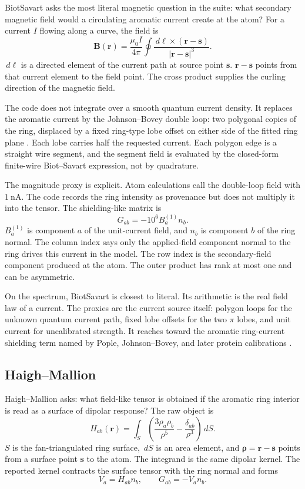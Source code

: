 \documentclass[11pt]{article}
\newcommand{\dd}{\,d}
\begin{document}
BiotSavart asks the most literal magnetic question in the suite: what secondary
magnetic field would a circulating aromatic current create at the atom? For a
current \(I\) flowing along a curve, the field is
\[
  \bm B(\bm r)
  =
  \frac{\mu_0 I}{4\pi}
  \oint
  \frac{\dd\bm\ell\times(\bm r-\bm s)}
       {|\bm r-\bm s|^3}.
\]
\(\dd\bm\ell\) is a directed element of the current path at source point
\(\bm s\). \(\bm r-\bm s\) points from that current element to the field point.
The cross product supplies the curling direction of the magnetic field.

The code does not integrate over a smooth quantum current density. It replaces
the aromatic current by the Johnson--Bovey double loop: two polygonal copies of
the ring, displaced by a fixed ring-type lobe offset on either side of the
fitted ring plane \cite{johnson1958}. Each lobe carries half the requested
current. Each polygon edge is a straight wire segment, and the segment field is
evaluated by the closed-form finite-wire Biot--Savart expression, not by
quadrature.

The magnitude proxy is explicit. Atom calculations call the double-loop field
with \(\SI{1}{\nano\ampere}\). The code records the ring intensity as
provenance but does not multiply it into the tensor. The shielding-like matrix
is
\[
  G_{ab}=-10^6 B_a^{(1)} n_b .
\]
\(B_a^{(1)}\) is component \(a\) of the unit-current field, and \(n_b\) is
component \(b\) of the ring normal. The column index says only the applied-field
component normal to the ring drives this current in the model. The row index is
the secondary-field component produced at the atom. The outer product has rank
at most one and can be asymmetric.

On the spectrum, BiotSavart is closest to literal. Its arithmetic is the real
field law of a current. The proxies are the current source itself: polygon
loops for the unknown quantum current path, fixed lobe offsets for the two
\(\pi\) lobes, and unit current for uncalibrated strength. It reaches toward the
aromatic ring-current shielding term named by Pople, Johnson--Bovey, and later
protein calibrations \cite{pople1956,johnson1958,case1995,boyd2002}.

\subsection{Haigh--Mallion}

Haigh--Mallion asks: what field-like tensor is obtained if the aromatic ring
interior is read as a surface of dipolar response? The raw object is
\[
  H_{ab}(\bm r)
  =
  \int_S
  \left(
    \frac{3\rho_a\rho_b}{\rho^5}
    -\frac{\delta_{ab}}{\rho^3}
  \right)
  \dd S .
\]
\(S\) is the fan-triangulated ring surface, \(\dd S\) is an area element, and
\(\bm\rho=\bm r-\bm s\) points from a surface point \(\bm s\) to the atom. The
integrand is the same dipolar kernel. The reported kernel contracts the surface
tensor with the ring normal and forms
\[
  V_a=H_{ab}n_b,
  \qquad
  G_{ab}=-V_a n_b .
\]
\end{document}
